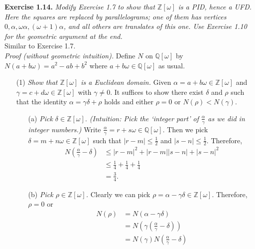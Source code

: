 \documentclass{article}
\begin{document}



\textbf{Exercise 1.14.}
\emph{Modify Exercise 1.7 to show that $\mathbb{Z}[\omega]$ is a PID, hence a UFD.
Here the squares are replaced by parallelograms;
one of them has vertices $0, \alpha, \omega\alpha, (\omega+1)\alpha$,
and all others are translates of this one.
Use Exercise 1.10 for the geometric argument at the end. } \\

Similar to Exercise 1.7. \\

\emph{Proof (without geometric intuition).}
Define $N$ on $\mathbb{Q}[\omega]$ by $N(a+b\omega) = a^2-ab+b^2$ where
$a+b\omega \in \mathbb{Q}[\omega]$ as usual.
\begin{enumerate}
\item[(1)]
\emph{Show that $\mathbb{Z}[\omega]$ is a Euclidean domain.}
Given $\alpha = a+b\omega \in \mathbb{Z}[\omega]$ and
$\gamma = c+d\omega \in \mathbb{Z}[\omega]$ with $\gamma \neq 0$.
It suffices to show there exist $\delta$ and $\rho$ such that the identity
$\alpha = \gamma\delta + \rho$ holds and
either $\rho = 0$ or $N(\rho) < N(\gamma)$.
\begin{enumerate}
\item[(a)]
\emph{Pick $\delta \in \mathbb{Z}[\omega].$
(Intuition: Pick the `integer part' of $\frac{\alpha}{\gamma}$
as we did in integer numbers.)}
Write $\frac{\alpha}{\gamma} = r+s\omega \in \mathbb{Q}[\omega]$.
Then we pick $\delta = m+n\omega \in \mathbb{Z}[\omega]$ such that
$|r-m| \leq \frac{1}{2}$ and $|s-n| \leq \frac{1}{2}$.
Therefore,
\begin{align*}
N\left( \frac{\alpha}{\gamma} - \delta \right)
&\leq |r-m|^2 + |r-m||s-n| + |s-n|^2 \\
&\leq \frac{1}{4} + \frac{1}{4} + \frac{1}{4} \\
&= \frac{3}{4}.
\end{align*}
\item[(b)]
\emph{Pick $\rho \in \mathbb{Z}[\omega]$.}
Clearly we can pick $\rho = \alpha - \gamma\delta \in \mathbb{Z}[\omega]$.
Therefore, $\rho = 0$ or
\begin{align*}
N(\rho)
&= N(\alpha - \gamma\delta) \\
&= N\left( \gamma\left( \frac{\alpha}{\gamma} - \delta \right) \right) \\
&= N(\gamma) N\left( \frac{\alpha}{\gamma} - \delta \right) \\

\end{align*}
\end{enumerate}
\end{enumerate}
\end{document}
